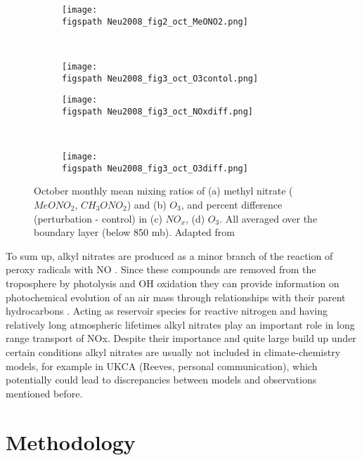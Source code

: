 \documentclass[11pt,a4paper]{article}
\newcommand{\figspath}{figures/}
\begin{document}
\begin{figure}[t!]
	\centering
	\begin{subfigure}[t]{0.45\textwidth}
        \centering
        \texttt{[image: \\figspath Neu2008\_fig2\_oct\_MeONO2.png]}
        \caption{}
        \label{fig:Neu2008M_MeONO2}
    \end{subfigure}%
    ~ %
    \begin{subfigure}[t]{0.5\textwidth}
        \centering
        \texttt{[image: \\figspath Neu2008\_fig3\_oct\_O3contol.png]}
        \caption{}
        \label{fig:Neu2008M_O3contol}
    \end{subfigure}
    \begin{subfigure}[t]{0.5\textwidth}
        \centering
        \texttt{[image: \\figspath Neu2008\_fig3\_oct\_NOxdiff.png]}
        \caption{}
        \label{fig:Neu2008M_NOxdiff}
    \end{subfigure}%
    ~
    \begin{subfigure}[t]{0.5\textwidth}
        \centering
        \texttt{[image: \\figspath Neu2008\_fig3\_oct\_O3diff.png]}
        \caption{}
        \label{fig:Neu2008M_O3diff}
    \end{subfigure}
\caption{October monthly mean mixing ratios of (a) methyl nitrate ($MeONO_2$, $CH_3ONO_2$) and (b) $O_3$, and percent difference (perturbation - control) in (c) $NO_x$, (d) $O_3$. All averaged over the boundary layer (below 850 mb). Adapted from \citep{Neu2008}}
\label{fig:Neu2008}
\end{figure}

To sum up, alkyl nitrates are produced as a minor branch of the reaction of peroxy radicals with NO \citep{Day2003}. Since these compounds are removed from the troposphere by photolysis and OH oxidation they can provide information on photochemical evolution of an air mass through relationships with their parent hydrocarbons \citep{Bertman1995}. Acting as reservoir species for reactive nitrogen and having relatively long atmospheric lifetimes alkyl nitrates play an important role in long range transport of NOx. Despite their importance and quite large build up under certain conditions alkyl nitrates are usually not included in climate-chemistry models, for example in UKCA (Reeves, personal communication), which potentially could lead to discrepancies between models and observations mentioned before. 

\section{Methodology} \label{sec:method}
\end{document}
